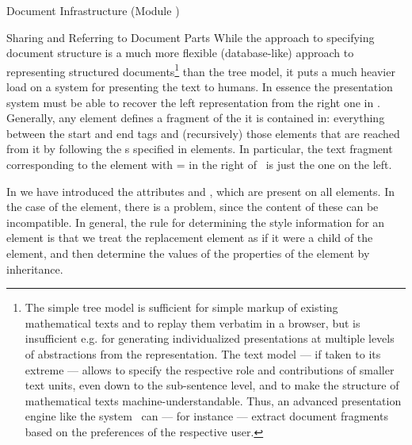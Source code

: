 \begin{tchapter}[id=omdoc-infrastructure,short=Document Infrastructure]{Document Infrastructure (Module {})}
\begin{tsection}[id=sharing,short=Sharing Document Parts]{Sharing and Referring to Document Parts}
While the {\omdoc} approach to specifying document structure is a much more
flexible (database-like) approach to representing structured
documents\footnote{The simple tree model is sufficient for simple markup of
  existing mathematical texts and to replay them verbatim in a browser, but is
  insufficient e.g. for generating individualized presentations at multiple levels
  of abstractions from the representation. The {\omdoc} text model --- if taken to
  its extreme --- allows to specify the respective role and contributions of
  smaller text units, even down to the sub-sentence level, and to make the
  structure of mathematical texts machine-understandable. Thus, an advanced
  presentation engine like the {\activemath} system~\cite{SieBen:acgap00} can ---
  for instance --- extract document fragments based on the preferences of the
  respective user.}  than the tree model, it puts a much heavier load on a system
for presenting the text to humans. In essence the presentation system must be able
to recover the left representation from the right one in {}.
Generally, any {\omdoc} element defines a fragment of the {\omdoc} it is contained
in: everything between the start and end tags and (recursively) those elements
that are reached from it by following the {s} specified in
{} elements.  In particular, the text fragment corresponding to the
element with {}={} in the right {\omdoc}
of~ is just the one on the left.

In {} we have introduced the {\css}
attributes {} and {},
which are present on all {\omdoc} elements. In the case of the {} element,
there is a problem, since the content of these can be incompatible. In general, the rule
for determining the style information for an element is that we treat the replacement
element as if it were a child of the {} element, and then determine the
values of the {\css} properties of the {} element by
inheritance.
\end{tsection}
\end{tchapter}


